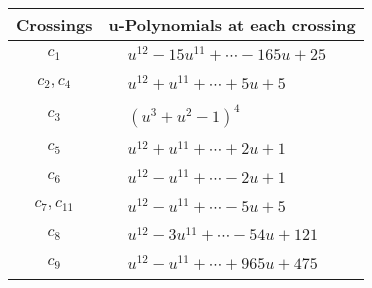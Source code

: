 \documentclass[1p]{elsarticle_modified}
\theoremstyle{definition}
\begin{document}
\begin{tabular}{m{50pt}|m{274pt}}
Crossings & \hspace{64pt}u-Polynomials at each crossing \\
\hline $$\begin{aligned}c_{1}\end{aligned}$$&$\begin{aligned}
&u^{12}-15 u^{11}+\cdots-165 u+25
\end{aligned}$\\
\hline $$\begin{aligned}c_{2},c_{4}\end{aligned}$$&$\begin{aligned}
&u^{12}+u^{11}+\cdots+5 u+5
\end{aligned}$\\
\hline $$\begin{aligned}c_{3}\end{aligned}$$&$\begin{aligned}
&(u^3+u^2-1)^4
\end{aligned}$\\
\hline $$\begin{aligned}c_{5}\end{aligned}$$&$\begin{aligned}
&u^{12}+u^{11}+\cdots+2 u+1
\end{aligned}$\\
\hline $$\begin{aligned}c_{6}\end{aligned}$$&$\begin{aligned}
&u^{12}- u^{11}+\cdots-2 u+1
\end{aligned}$\\
\hline $$\begin{aligned}c_{7},c_{11}\end{aligned}$$&$\begin{aligned}
&u^{12}- u^{11}+\cdots-5 u+5
\end{aligned}$\\
\hline $$\begin{aligned}c_{8}\end{aligned}$$&$\begin{aligned}
&u^{12}-3 u^{11}+\cdots-54 u+121
\end{aligned}$\\
\hline $$\begin{aligned}c_{9}\end{aligned}$$&$\begin{aligned}
&u^{12}- u^{11}+\cdots+965 u+475
\end{aligned}$\\

\end{tabular}
\end{document}
